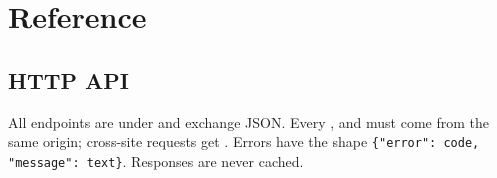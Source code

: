 \chapter{Reference}
\label{ch:reference}

\section{HTTP API}

All endpoints are under  and exchange JSON. Every ,  and  must come from the same origin; cross-site requests get . Errors have the shape \texttt{\{"error": code, "message": text\}}. Responses are never cached.

\newcommand{\ep}[3]{\code{#1} & \fpath{#2} & #3 \\}
\newcommand{\apigroup}[1]{\midrule\multicolumn{3}{@{}l}{\textsf{\textbf{\small\color{accent}#1}}}\\}
\begingroup\small
